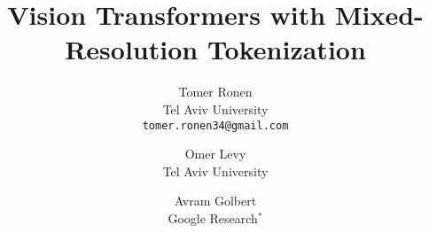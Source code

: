 \documentclass[10pt,twocolumn,letterpaper]{article}
\begin{document}
\title{Vision Transformers with Mixed-Resolution Tokenization}

\author{
Tomer Ronen\\
Tel Aviv University\\
{\tt\small tomer.ronen34@gmail.com}
\and
Omer Levy\\
Tel Aviv University\\
\and
Avram Golbert\\
Google Research$^\text{*}$
}



\clearpage

{\small


}
\end{document}
